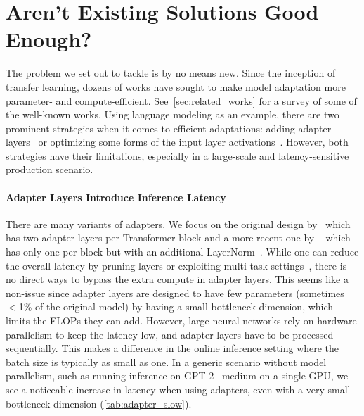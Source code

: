 \documentclass{article} %
\begin{document}
\section{Aren't Existing Solutions Good Enough?}
\label{sec:existing_solutions_no_good}

The problem we set out to tackle is by no means new.
Since the inception of transfer learning, dozens of works have sought to make model adaptation more parameter- and compute-efficient.
See~\autoref{sec:related_works} for a survey of some of the well-known works.
Using language modeling as an example, there are two prominent strategies when it comes to efficient adaptations: adding adapter layers~\citep{houlsby_parameter-efficient_2019, rebuffi_learning_2017, pfeiffer2021adapterfusion, ruckle2020adapterdrop} or optimizing some forms of the input layer activations~\citep{li_prefix-tuning_2021, lester_power_2021, hambardzumyan_warp_2020, liu_gpt_2021}.
However, both strategies have their limitations, especially in a large-scale and latency-sensitive production scenario.

\paragraph{Adapter Layers Introduce Inference Latency}
There are many variants of adapters.
We focus on the original design by~\citet{houlsby_parameter-efficient_2019} which has two adapter layers per Transformer block and a more recent one by ~\citet{lin-etal-2020-exploring} which has only one per block but with an additional LayerNorm~\citep{ba2016layer}.
While one can reduce the overall latency by pruning layers or exploiting multi-task settings~\citep{ruckle2020adapterdrop,pfeiffer2021adapterfusion}, there is no direct ways to bypass the extra compute in adapter layers.
This seems like a non-issue since adapter layers are designed to have few parameters (sometimes $<$1\% of the original model) by having a small bottleneck dimension, which limits the FLOPs they can add.
However, large neural networks rely on hardware parallelism to keep the latency low, and adapter layers have to be processed sequentially.
This makes a difference in the online inference setting where the batch size is typically as small as one.
In a generic scenario without model parallelism, such as running inference on GPT-2~\citep{radford_language_nodate} medium on a single GPU, we see a noticeable increase in latency when using adapters, even with a very small bottleneck dimension (\autoref{tab:adapter_slow}).
\end{document}
